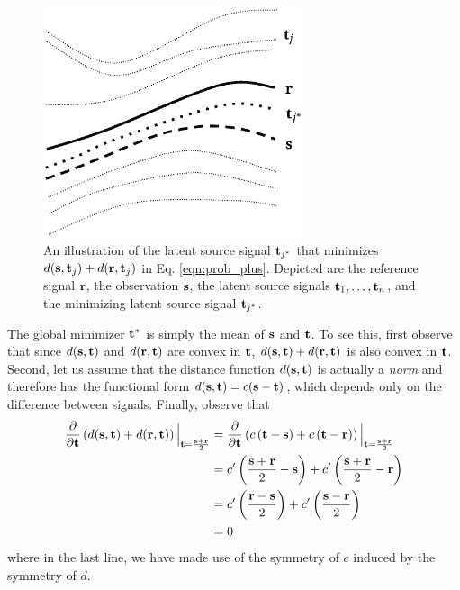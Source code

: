 \begin{figure}[h!]
\begin{center}
\includegraphics[width=3in]{latentsources}
\end{center}
\caption{\label{fig:conv_comb} An illustration of the latent source signal
  $\mathbf t_{j^*}$ that minimizes $d(\mathbf s,\mathbf t_j) + d(\mathbf r,\mathbf t_j)$ in
  Eq. \ref{eqn:prob_plus}. Depicted are the reference signal $\mathbf r$, the
  observation $\mathbf s$, the latent source signals $\mathbf t_1, \dots, \mathbf t_n$, and the
  minimizing latent source signal $\mathbf t_{j^*}$.}
\end{figure}

The global minimizer $\mathbf t^*$ is simply the mean of $\mathbf s$ and $\mathbf t$. To see
this, first observe that since $d(\mathbf s,\mathbf t)$ and $d(\mathbf r, \mathbf t)$ are convex
in $\mathbf t$, $d(\mathbf s,\mathbf t) + d(\mathbf r,\mathbf t)$ is also convex in $\mathbf t$. Second,
let us assume that the distance function $d(\mathbf s,\mathbf t)$ is actually a {\em
  norm} and therefore has the functional form $d(\mathbf s,\mathbf t) = c(\mathbf s-\mathbf t)$,
which depends only on the difference between signals. Finally, observe that
\begin{align}
\frac{\partial}{\partial \mathbf t} \left(d(\mathbf s,\mathbf t) + d(\mathbf r,\mathbf t)\right)\Big|_{\mathbf t = \frac{\mathbf s + \mathbf r}{2}}
&= \frac{\partial}{\partial \mathbf t}\left(c\left(\mathbf t - \mathbf s\right) + c\left(\mathbf t-\mathbf r\right)\right)\Big|_{\mathbf t = \frac{\mathbf s + \mathbf r}{2}}\notag\\
&= c'\left(\frac{\mathbf s+\mathbf r}{2} - \mathbf s\right) + c'\left(\frac{\mathbf s+\mathbf r}{2}-\mathbf r\right)\notag\\
&= c'\left(\frac{\mathbf r-\mathbf s}{2}\right) + c'\left(\frac{\mathbf s-\mathbf r}{2}\right)\notag\\
&= 0
\end{align}
where in the last line, we have made use of the symmetry of $c$ induced by the symmetry of $d$.

